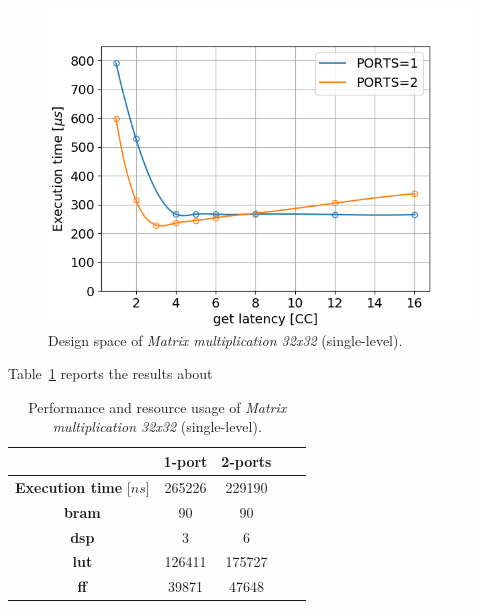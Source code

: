 \documentclass[11pt,a4paper,oneside]{memoir}
\begin{document}
\begin{figure}[H]
	\centering
	\includegraphics[width=.8\textwidth]{matmul_32_multiport_no_L1_latency}
	\caption{Design space of \emph{Matrix multiplication 32x32}
	(single-level).}
	\label{fig:matmul_32_no_l1_space}
\end{figure}

Table~\ref{tab:matmul_32_no_l1_report} reports the results about 

\begin{table}[H]
	\begin{center}
		\begin{tabular}{ccccc}
			\hline
			\rowcolor{gray!50}
			& \textbf{1-port} & \textbf{2-ports} \\
			\hline
			\textbf{Execution time} [$ns$] & 265226 & 229190 \\
			\rowcolor{gray!25}
			\textbf{\ac{bram}} & 90 & 90 \\
			\textbf{\acs{dsp}} & 3 & 6 \\
			\rowcolor{gray!25}
			\textbf{\acs{lut}} & 126411 & 175727 \\
			\textbf{\acs{ff}} & 39871 & 47648 \\
			\hline
		\end{tabular}
	\end{center}
	\caption{Performance and resource usage of \emph{Matrix multiplication
	32x32} (single-level).}
	\label{tab:matmul_32_no_l1_report}
\end{table}
\end{document}
